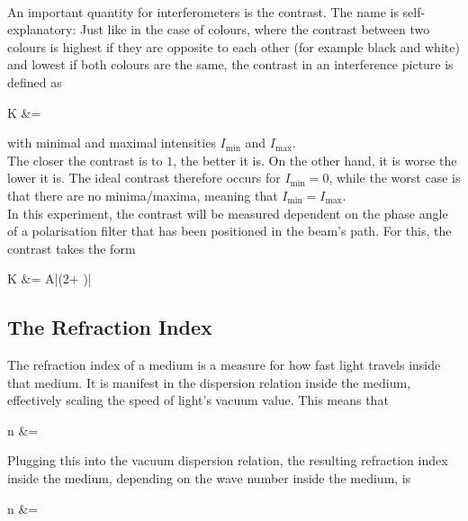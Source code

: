 \\
An important quantity for interferometers is the contrast. The name is self-explanatory: Just like in the case of colours, where the contrast between two colours is highest if they are opposite to each other (for example black and white) and lowest if both colours are the same, the contrast in an interference picture is defined as 
\begin{aquation}
  K &=  \tc
  \label{eq:contrast}
\end{aquation}
with minimal and maximal intensities $I_\text{min}$ and $I_\text{max}$.\\
The closer the contrast is to $1$, the better it is. On the other hand, it is worse the lower it is. The ideal contrast therefore occurs for $I_\text{min}=0$, while the worst case is that there are no minima/maxima, meaning that $I_\text{min}=I_\text{max}$.\\
In this experiment, the contrast will be measured dependent on the phase angle of a polarisation filter that has been positioned in the beam's path. For this, the contrast takes the form 
\begin{aquation}
K &= A|\sin(2\varphi + \delta)| \tp
\end{aquation}

\subsection{The Refraction Index}
The refraction index of a medium is a measure for how fast light travels inside that medium. It is manifest in the dispersion relation inside the medium, effectively scaling the speed of light's vacuum value. This means that 
\begin{aquation}
  n &=  \tp 
\end{aquation}
Plugging this into the vacuum dispersion relation, the resulting refraction index inside the medium, depending on the wave number inside the medium, is
\begin{aquation}
  n &=  \tp
\end{aquation}
